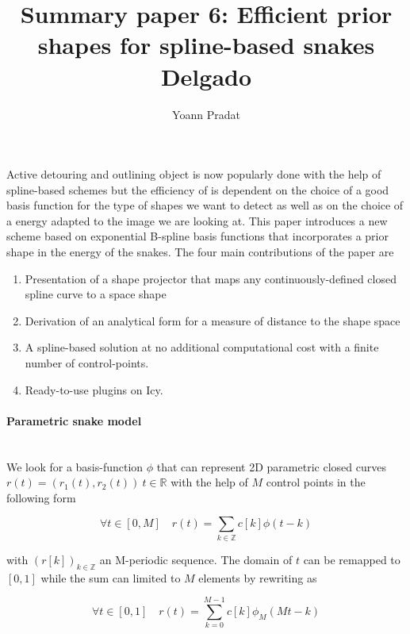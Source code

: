 \documentclass[a4paper, 11pt]{article}
\begin{document}
\title{Summary paper 6: Efficient prior shapes for spline-based snakes Delgado}
\author{Yoann Pradat}
\maketitle

Active detouring and outlining object is now popularly done with the help of spline-based schemes but the efficiency of 
is dependent on the choice of a good basis function for the type of shapes we want to detect as well as on the choice of 
a energy adapted to the image we are looking at. This paper introduces a new scheme based on exponential B-spline basis 
functions that incorporates a prior shape in the energy of the snakes. The four main contributions of the paper are

\begin{enumerate}
  \item Presentation of a shape projector that maps any continuously-defined closed spline curve to a space shape
  \item Derivation of an analytical form for a measure of distance to the shape space
  \item A spline-based solution at no additional computational cost with a finite number of control-points.
  \item Ready-to-use plugins on Icy.
\end{enumerate}

\paragraph{Parametric snake model} \mbox{} \\

We look for a basis-function $\phi$ that can represent 2D parametric closed curves $r(t) = (r_1(t), r_2(t)) \ t \in 
\mathbb{R}$ with the help of $M$ control points in the following form

\begin{equation}
  \label{gen_form}
  \forall t \in [0, M] \quad r(t) = \sum_{k \in \mathbb{Z}} c[k] \phi(t-k)
\end{equation}

with ${(r[k])}_{k \in \mathbb{Z}}$ an M-periodic sequence. The domain of $t$ can be remapped to $[0,1]$ while the sum 
can limited to $M$ elements by rewriting as

\begin{equation}
  \label{comp_form}
  \forall t \in [0, 1] \quad r(t) = \sum_{k=0}^{M-1} c[k] \phi_{M}(Mt-k)
\end{equation}
\end{document}
